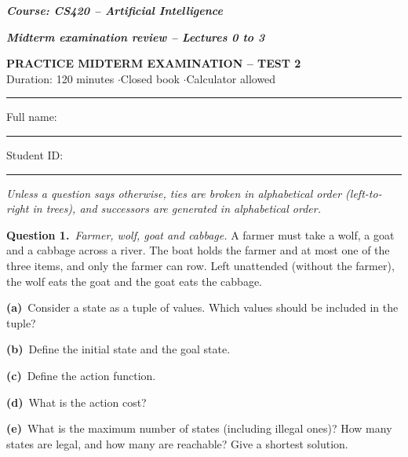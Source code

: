 \documentclass[11pt,a4paper]{article}
\newcommand{\question}[1]{\par\medskip\noindent\textbf{Question #1.}\ }
\newcommand{\subq}[1]{\par\smallskip\noindent\textbf{#1}\ }
\begin{document}
{\large\textbf{\textit{Course: CS420 -- Artificial Intelligence}}}\par
{\textbf{\textit{Midterm examination review -- Lectures 0 to 3}}}\par
\begin{center}{\Large\bfseries PRACTICE MIDTERM EXAMINATION -- TEST 2}\\[3pt]
{\small Duration: 120 minutes \quad$\cdot$\quad Closed book \quad$\cdot$\quad Calculator allowed}\end{center}
\noindent\rule{\linewidth}{0.6pt}

\noindent Full name: \rule{6.5cm}{0.3pt}\hfill Student ID: \rule{4cm}{0.3pt}\par\smallskip
{\small\textit{Unless a question says otherwise, ties are broken in alphabetical order (left-to-right in trees), and successors are generated in alphabetical order.}}\par
\question{1}\textit{Farmer, wolf, goat and cabbage.} A farmer must take a wolf, a goat and a cabbage across a river. The boat holds the farmer and at most one of the three items, and only the farmer can row. Left unattended (without the farmer), the wolf eats the goat and the goat eats the cabbage.
\subq{(a)}Consider a state as a tuple of values. Which values should be included in the tuple?
\begin{ansbox}[height=1.0cm]\end{ansbox}
\subq{(b)}Define the initial state and the goal state.
\begin{ansbox}[height=0.8cm]\end{ansbox}
\subq{(c)}Define the action function.
\begin{ansbox}[height=1.8cm]\end{ansbox}
\subq{(d)}What is the action cost?
\begin{ansbox}[height=0.6cm]\end{ansbox}
\subq{(e)}What is the maximum number of states (including illegal ones)? How many states are legal, and how many are reachable? Give a shortest solution.
\begin{ansbox}[height=2.0cm]\end{ansbox}
\end{document}
